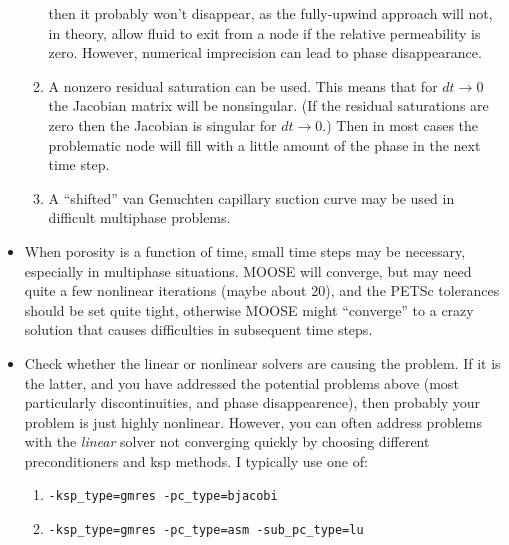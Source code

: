 \documentclass[]{scrreprt}
\begin{document}
\begin{itemize}
\begin{enumerate}
  then it probably won't disappear, as the fully-upwind approach will
  not, in theory, allow fluid to exit from a node if the relative
  permeability is zero.  However, numerical imprecision can lead to
  phase disappearance.
\item A nonzero residual saturation can be used.  This means that for
  $dt\rightarrow 0$ the Jacobian matrix will be nonsingular.  (If the
  residual saturations are zero then the Jacobian is singular for
  $dt\rightarrow 0$.)  Then in most cases the problematic node will
  fill with a little amount of the phase in the next time step.
\item A ``shifted'' van Genuchten capillary suction curve may be used
  in difficult multiphase problems.
\end{enumerate}
\item When porosity is a function of time, small time steps may be
  necessary, especially in multiphase situations.  MOOSE will
  converge, but may need quite a few nonlinear iterations (maybe about
  20), and the PETSc tolerances should be set quite tight, otherwise
  MOOSE might ``converge'' to a crazy solution that causes
  difficulties in subsequent time steps.
\item Check whether the linear or nonlinear solvers are causing the
  problem.  If it is the latter, and you have addressed the potential
  problems above (most particularly discontinuities, and phase
  disappearence), then probably your problem is just highly
  nonlinear.  However, you can often address problems with the
  {\em linear} solver not converging quickly by choosing different
  preconditioners and ksp methods.  I typically use one of:
\begin{enumerate}
\item {\tt -ksp\_type=gmres -pc\_type=bjacobi}
\item {\tt -ksp\_type=gmres -pc\_type=asm -sub\_pc\_type=lu}
\end{enumerate}
\end{itemize}
\end{document}
